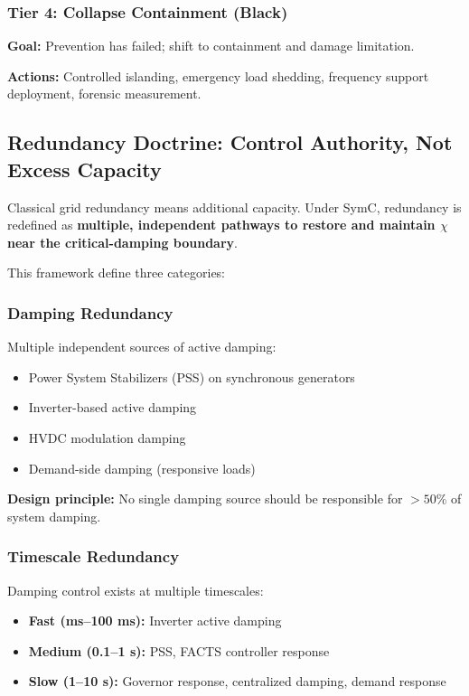 \documentclass[11pt,letterpaper]{article}
\begin{document}
\subsubsection{Tier 4: Collapse Containment (Black)}

\textbf{Goal:} Prevention has failed; shift to containment and damage limitation.

\textbf{Actions:} Controlled islanding, emergency load shedding, frequency support deployment, forensic measurement.

\subsection{Redundancy Doctrine: Control Authority, Not Excess Capacity}

Classical grid redundancy means additional capacity. Under SymC, redundancy is redefined as \textbf{multiple, independent pathways to restore and maintain $\chi$ near the critical-damping boundary}.

This framework define three categories:

\subsubsection{Damping Redundancy}

Multiple independent sources of active damping:
\begin{itemize}
\item Power System Stabilizers (PSS) on synchronous generators
\item Inverter-based active damping
\item HVDC modulation damping
\item Demand-side damping (responsive loads)
\end{itemize}

\textbf{Design principle:} No single damping source should be responsible for $> 50\%$ of system damping.

\subsubsection{Timescale Redundancy}

Damping control exists at multiple timescales:
\begin{itemize}
\item \textbf{Fast (ms--100 ms):} Inverter active damping
\item \textbf{Medium (0.1--1 s):} PSS, FACTS controller response
\item \textbf{Slow (1--10 s):} Governor response, centralized damping, demand response
\end{itemize}
\end{document}
